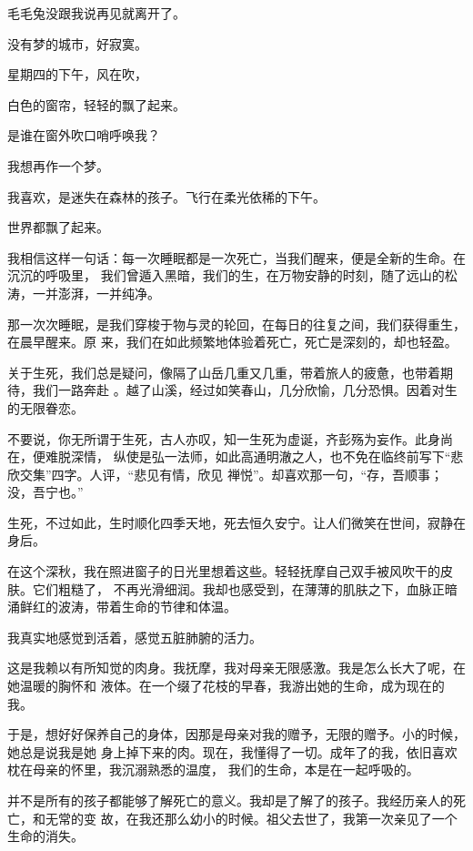 \documentclass[12pt,a4paper]{article}
\begin{document}
		毛毛兔没跟我说再见就离开了。

		没有梦的城市，好寂寞。

		星期四的下午，风在吹，

		白色的窗帘，轻轻的飘了起来。

		是谁在窗外吹口哨呼唤我？

		我想再作一个梦。

		我喜欢，是迷失在森林的孩子。飞行在柔光依稀的下午。

		世界都飘了起来。

	\endwriting



		我相信这样一句话：每一次睡眠都是一次死亡，当我们醒来，便是全新的生命。在沉沉的呼吸里，
	我们曾遁入黑暗，我们的生，在万物安静的时刻，随了远山的松涛，一并澎湃，一并纯净。

		那一次次睡眠，是我们穿梭于物与灵的轮回，在每日的往复之间，我们获得重生，在晨早醒来。原
	来，我们在如此频繁地体验着死亡，死亡是深刻的，却也轻盈。

		关于生死，我们总是疑问，像隔了山岳几重又几重，带着旅人的疲惫，也带着期待，我们一路奔赴
	。越了山溪，经过如笑春山，几分欣愉，几分恐惧。因着对生的无限眷恋。

		不要说，你无所谓于生死，古人亦叹，知一生死为虚诞，齐彭殇为妄作。此身尚在，便难脱深情，
	纵使是弘一法师，如此高通明澈之人，也不免在临终前写下“悲欣交集”四字。人评，“悲见有情，欣见
	禅悦”。却喜欢那一句，“存，吾顺事；没，吾宁也。”

		生死，不过如此，生时顺化四季天地，死去恒久安宁。让人们微笑在世间，寂静在身后。

		在这个深秋，我在照进窗子的日光里想着这些。轻轻抚摩自己双手被风吹干的皮肤。它们粗糙了，
	不再光滑细润。我却也感受到，在薄薄的肌肤之下，血脉正暗涌鲜红的波涛，带着生命的节律和体温。

		我真实地感觉到活着，感觉五脏肺腑的活力。

		这是我赖以有所知觉的肉身。我抚摩，我对母亲无限感激。我是怎么长大了呢，在她温暖的胸怀和
	液体。在一个缀了花枝的早春，我游出她的生命，成为现在的我。

		于是，想好好保养自己的身体，因那是母亲对我的赠予，无限的赠予。小的时候，她总是说我是她
	身上掉下来的肉。现在，我懂得了一切。成年了的我，依旧喜欢枕在母亲的怀里，我沉溺熟悉的温度，
	我们的生命，本是在一起呼吸的。

		并不是所有的孩子都能够了解死亡的意义。我却是了解了的孩子。我经历亲人的死亡，和无常的变
	故，在我还那么幼小的时候。祖父去世了，我第一次亲见了一个生命的消失。
\end{document}
